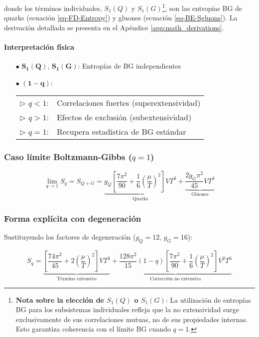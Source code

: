 donde los términos individuales, ${S}_{1}(Q)$ y ${S}_{1}(G)$\footnote{\textbf{Nota sobre la elección de ${S}_{1}(Q)$ o ${S}_{1}(G)$}:
La utilización de entropías BG para los subsistemas individuales refleja que la no extensividad surge exclusivamente de sus correlaciones mutuas, no de sus propiedades internas. Esto garantiza coherencia con el límite BG cuando $q=1$.}, son las entropías BG de quarks (ecuación \ref{eq-FD-Entropy}) y gluones (ecuación \ref{eq-BE-Sgluons}). La derivación detallada se presenta en el Apéndice \ref{app:math_derivations}.

\paragraph{Interpretación física}  
\begin{itemize}
    \item[$\bullet$] $\bm{{S}_1\left(Q\right)}$, $\bm{{S}_1\left(G\right)}$: Entropías de BG independientes
    \item[$\bullet$] $\bm{\left(1-q\right)}$: \\ 
    \begin{tabular}{@{\quad}ll}
        $\triangleright$ $q<1$: & Correlaciones fuertes (superextensividad) \\
        $\triangleright$ $q>1$: & Efectos de exclusión (subextensividad) \\
        $\triangleright$ $q=1$: & Recupera estadística de BG estándar
    \end{tabular}
\end{itemize}

\subsubsection*{Caso límite Boltzmann-Gibbs ($q=1$)}
\begin{equation}\label{eq-BG-limit}
\lim_{q \to 1} {S}_q = {S}_{Q+G} = \underbrace{{g}_Q \left[\frac{7\pi^2}{90} + \frac{1}{6}\left(\frac{\mu}{T}\right)^2\right]V T^3}_{\text{Quarks}} + \underbrace{\frac{2g_G\pi^2}{45}V T^3}_{\text{Gluones}}
\end{equation}

\subsubsection*{Forma explícita con degeneración}
Sustituyendo los factores de degeneración ($g_Q=12$, $g_G=16$):

\begin{equation}\label{eq-Tsallis-Entropy-final}
{S}_q = \underbrace{\left[\frac{74\pi^2}{45} + 2\left(\frac{\mu}{T}\right)^2\right]V T^3}_{\text{Término extensivo}} + \underbrace{\frac{128\pi^2}{15}(1-q)\left[\frac{7\pi^2}{90} + \frac{1}{6}\left(\frac{\mu}{T}\right)^2\right]V^2 T^6}_{\text{Corrección no extensiva}}
\end{equation}


